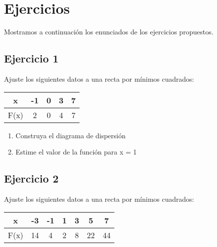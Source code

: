 \documentclass[a4paper,10pt,twocolumn]{article}
\begin{document}



\section{Ejercicios}\label{sec:dev}
	Mostramos a continuación los enunciados de los ejercicios propuestos.

	\subsection{Ejercicio 1}\label{sub:E1}
	Ajuste los siguientes datos a una recta por mínimos cuadrados:
	
	\begin{table}[h]
		\centering
		\begin{tabular}{|c|c|c|c|c|}
			\hline
			x & -1 & 0 & 3 & 7\\ \hline
			F(x) & 2 & 0 & 4 & 7 \\ \hline
		\end{tabular}
		\label{table:EJ1}
	\end{table}

	\begin{enumerate}
		\item {Construya el diagrama de dispersión}
		\item {Estime el valor de la función para x = 1}
	\end{enumerate}

	\subsection{Ejercicio 2}\label{sub:OEJ2}
	Ajuste los siguientes datos a una recta por mínimos cuadrados:
	
	\begin{table}[h]
		\centering
		\begin{tabular}{|c|c|c|c|c|c|c|}
			\hline
			x & -3 & -1 & 1 & 3 & 5 & 7 \\ \hline
			F(x) & 14 & 4 & 2 & 8 & 22 & 44 \\ \hline
		\end{tabular}
		\label{table:EJ2}
	\end{table}
\end{document}
